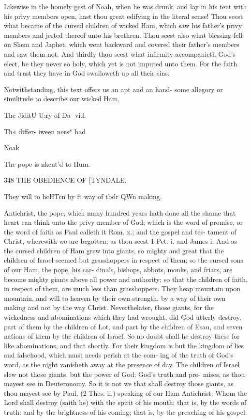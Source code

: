 \documentclass{custom}
\begin{document}
{Likewise in the homely gest of Noah, when he was 
drunk, and lay in his tent with his privy members open, 
hast thou great edifying in the literal sense! Thou seest 
what became of the cursed children of wicked Ham, which 
saw his father's privy members and jested thereof unto his 
brethren. Thou seest also what blessing fell on Shem and 
Japhet, which went backward and covered their father's 
members and saw them not. And thirdly thou seest what 
infirmity accompanieth God's elect, be they never so holy, 
which yet is not imputed unto them. For the faith and 
trust they have in God swalloweth up all their sins. 

Notwithstanding, this text offers us an apt and an hand- 
some allegory or similitude to describe our wicked Ham, 

The JiditU 
U:ry of Da- 
vid. 

Th« differ- 
iween 
ners* had 

Noak 

The pope is 
nkent'd to 
Hum. 


348
THE OBEDIENCE OF
[TYNDALE.

They will 
to hcHTcn 
by ft way of 
tbdr QWn 
making. 

Antichrist, the pope, which many hundred years hath done 
all the shame that heart can think unto the privy member 
of God; which is the word of promise, or the word of 
faith as Paul calleth it Rom. x.; and the gospel and tes- 
tament of Christ, wherewith we are begotten; as thou 
seest 1 Pet. i. and James i. And as the cursed children 
of Ham grew into giants, so mighty and great that the 
children of Israel seemed but grasshoppers in respect of 
them; so the cursed sons of our Ham, the pope, his car- 
dinals, bishops, abbots, monks, and friars, are become 
mighty giants above all power and authority; so that the 
children of faith, in respect of them, are much less than 
grasshoppers. They heap mountain upon mountain, and 
will to heaven by their own strength, by a way of their own 
making and not by the way Christ. Neverthelater, 
those giants, for the wickedness and abominations which 
they had wrought, did God utterly destroy, part of them 
by the children of Lot, and part by the children of Esau, 
and seven nations of them by the children of Israel. So 
no doubt shall he destroy these for like abominations, and 
that shortly. For their kingdom is but the kingdom of 
lies and falsehood, which must needs perish at the com- 
ing of the truth of God's word, as the night vanisheth away 
at the presence of day. The children of Israel slew not 
those giants, but the power of God; God's truth and pro- 
mises, as thou mayest see in Deuteronomy. So it is not we 
that shall destroy those giants, as thou mayest see by Paul, 
(2 Thes. ii.) speaking of our Ham Antichrist: Whom the 
Lord shall destroy (saith he) with the spirit of his mouth; 
that is, by the words of truth: and by the brightness of his 
coming; that is, by the preaching of his gospel. 

}
\end{document}
